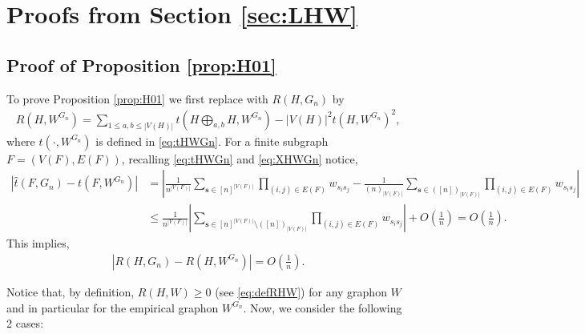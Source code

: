 \documentclass[11pt,reqno]{amsart}
\numberwithin{equation}{section}
\theoremstyle{definition}
\begin{document}
\section{Proofs from Section \ref{sec:LHW}}


\subsection{Proof of Proposition \ref{prop:H01}} \label{sec:H01pf} 

To prove Proposition \ref{prop:H01} we first replace with $R(H,G_n)$ by 
\begin{align*}
    R\left(H, W^{G_n}\right) = \sum_{1\leq a,b\leq |V(H)|}t\left(H\bigoplus_{a,b}H,W^{G_n}\right)-|V(H)|^2t(H,W^{G_n})^2 , 
\end{align*}
where $t(\cdot, W^{G_n})$ is defined in \eqref{eq:tHWGn}. For a finite subgraph $F = (V(F), E(F))$, recalling \eqref{eq:tHWGn} and \eqref{eq:XHWGn} notice,
\begin{align}\label{eq:tGntWGn}
    \left|\hat{t}(F,G_n) - t(F,W^{G_n})\right| 
    &= \left|\frac{1}{n^{|V(F)|}}\sum_{\bm{s} \in [n]^{|V(F)|}}\prod_{(i,j)\in E(F)}w_{s_is_j} - \frac{1}{(n)_{|V(F)|}}\sum_{ \bm{s} \in ([n])_{|V(F)|}}\prod_{(i,j)\in E(F)}w_{s_is_j}\right|\nonumber\\
    &\leq \frac{1}{n^{|V(F)|}}\left|\sum_{\bm{s} \in [n]^{|V(F)|}\setminus([n])_{|V(F)|}}\prod_{(i,j)\in E(F)}w_{s_is_j}\right| + O\left(\frac{1}{n}\right) = O\left(\frac{1}{n}\right).
\end{align}
This implies,
\begin{align}\label{eq:RHGnWGn}
    \left|R(H,G_n) - R(H,W^{G_n})\right| = O\left(\frac{1}{n}\right).
\end{align} 

Notice that, by definition, $R(H,W)\geq 0$ (see \eqref{eq:defRHW}) for any graphon $W$ and in particular for the empirical graphon $W^{G_{n}}$. Now, we consider the following 2 cases: 
\end{document}
